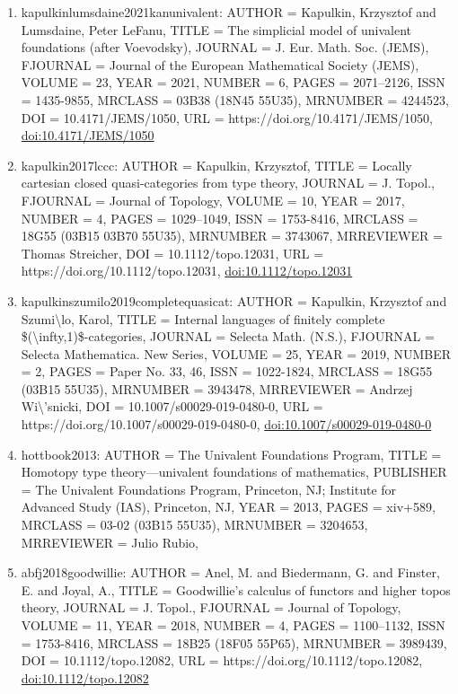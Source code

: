 \documentclass[11pt]{article}
\begin{document}
\begin{enumerate}[leftmargin=*]
  \item kapulkinlumsdaine2021kanunivalent: AUTHOR = Kapulkin, Krzysztof and Lumsdaine, Peter LeFanu, TITLE = The simplicial model of univalent foundations (after Voevodsky), JOURNAL = J. Eur. Math. Soc. (JEMS), FJOURNAL = Journal of the European Mathematical Society (JEMS), VOLUME = 23, YEAR = 2021, NUMBER = 6, PAGES = 2071--2126, ISSN = 1435-9855, MRCLASS = 03B38 (18N45 55U35), MRNUMBER = 4244523, DOI = 10.4171/JEMS/1050, URL = https://doi.org/10.4171/JEMS/1050, \href{https://doi.org/10.4171/JEMS/1050}{doi:10.4171/JEMS/1050}
  \item kapulkin2017lccc: AUTHOR = Kapulkin, Krzysztof, TITLE = Locally cartesian closed quasi-categories from type theory, JOURNAL = J. Topol., FJOURNAL = Journal of Topology, VOLUME = 10, YEAR = 2017, NUMBER = 4, PAGES = 1029--1049, ISSN = 1753-8416, MRCLASS = 18G55 (03B15 03B70 55U35), MRNUMBER = 3743067, MRREVIEWER = Thomas Streicher, DOI = 10.1112/topo.12031, URL = https://doi.org/10.1112/topo.12031, \href{https://doi.org/10.1112/topo.12031}{doi:10.1112/topo.12031}
  \item kapulkinszumilo2019completequasicat: AUTHOR = Kapulkin, Krzysztof and Szumi\textbackslash{}lo, Karol, TITLE = Internal languages of finitely complete \$(\textbackslash{}infty,1)\$-categories, JOURNAL = Selecta Math. (N.S.), FJOURNAL = Selecta Mathematica. New Series, VOLUME = 25, YEAR = 2019, NUMBER = 2, PAGES = Paper No. 33, 46, ISSN = 1022-1824, MRCLASS = 18G55 (03B15 55U35), MRNUMBER = 3943478, MRREVIEWER = Andrzej Wi\textbackslash{}'snicki, DOI = 10.1007/s00029-019-0480-0, URL = https://doi.org/10.1007/s00029-019-0480-0, \href{https://doi.org/10.1007/s00029-019-0480-0}{doi:10.1007/s00029-019-0480-0}
  \item hottbook2013: AUTHOR = The Univalent Foundations Program, TITLE = Homotopy type theory---univalent foundations of mathematics, PUBLISHER = The Univalent Foundations Program, Princeton, NJ; Institute for Advanced Study (IAS), Princeton, NJ, YEAR = 2013, PAGES = xiv+589, MRCLASS = 03-02 (03B15 55U35), MRNUMBER = 3204653, MRREVIEWER = Julio Rubio,
  \item abfj2018goodwillie: AUTHOR = Anel, M. and Biedermann, G. and Finster, E. and Joyal, A., TITLE = Goodwillie's calculus of functors and higher topos theory, JOURNAL = J. Topol., FJOURNAL = Journal of Topology, VOLUME = 11, YEAR = 2018, NUMBER = 4, PAGES = 1100--1132, ISSN = 1753-8416, MRCLASS = 18B25 (18F05 55P65), MRNUMBER = 3989439, DOI = 10.1112/topo.12082, URL = https://doi.org/10.1112/topo.12082, \href{https://doi.org/10.1112/topo.12082}{doi:10.1112/topo.12082}

\end{enumerate}
\end{document}
